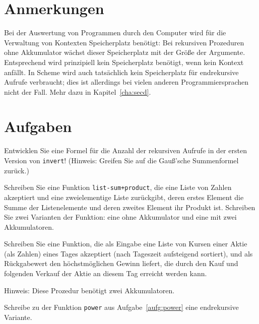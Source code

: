 \section*{Anmerkungen}

Bei der Auswertung von Programmen durch den Computer wird für die
Verwaltung von Kontexten Speicherplatz benötigt: Bei rekursiven
Prozeduren ohne Akkumulator wächst dieser Speicherplatz mit der Größe
der Argumente.  Entsprechend wird prinzipiell kein Speicherplatz
benötigt, wenn kein Kontext anfällt.  In Scheme wird auch tatsächlich
kein Speicherplatz für endrekursive Aufrufe verbraucht; dies ist
allerdings bei vielen anderen Programmiersprachen nicht der Fall.
Mehr dazu in Kapitel~\ref{cha:secd}.

\section*{Aufgaben}

\begin{aufgabe}
  \label{ref:o-of-invert}
  Entwicklen Sie eine Formel für die Anzahl der rekursiven Aufrufe in
  der ersten Version von \texttt{invert}!  (Hinweis: Greifen Sie auf
  die Gauß'sche Summenformel zurück.)
\end{aufgabe}

\begin{aufgabe}
  Schreiben Sie eine Funktion \texttt{list-sum+product}, die eine
  Liste von Zahlen akzeptiert und eine zweielementige Liste
  zurückgibt, deren erstes Element die Summe der Listenelemente und
  deren zweites Element ihr Produkt ist.  Schreiben Sie zwei Varianten
  der Funktion: eine ohne Akkumulator und eine mit zwei Akkumulatoren.
\end{aufgabe}

\begin{aufgabe}
  Schreiben Sie eine Funktion, die als Eingabe eine Liste von Kursen
  einer Aktie (als Zahlen) eines Tages akzeptiert (nach Tageszeit
  aufsteigend sortiert), und als Rückgabewert den höchstmöglichen
  Gewinn liefert, die durch den Kauf und folgenden Verkauf der Aktie
  an diesem Tag erreicht werden kann.

  Hinweis: Diese Prozedur benötigt zwei Akkumulatoren.
\end{aufgabe}

\begin{aufgabe}
  Schreibe zu der Funktion \texttt{power} aus Aufgabe~\ref{aufg:power} eine
  endrekursive Variante.
\end{aufgabe}

